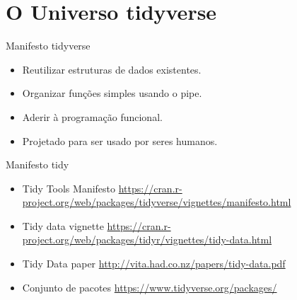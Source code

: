 \documentclass[
  9pt,
  ignorenonframetext,
]{beamer}
\begin{document}
\hypertarget{o-universo-tidyverse}{%
\section{O Universo tidyverse}\label{o-universo-tidyverse}}

\begin{frame}{Manifesto tidyverse}
\protect\hypertarget{manifesto-tidyverse}{}
\begin{itemize}
\item
  Reutilizar estruturas de dados existentes.
\item
  Organizar funções simples usando o pipe.
\item
  Aderir à programação funcional.
\item
  Projetado para ser usado por seres humanos.
\end{itemize}
\end{frame}

\begin{frame}{Manifesto tidy}
\protect\hypertarget{manifesto-tidy}{}
\begin{itemize}
\item
  Tidy Tools Manifesto
  \url{https://cran.r-project.org/web/packages/tidyverse/vignettes/manifesto.html}
\item
  Tidy data vignette
  \url{https://cran.r-project.org/web/packages/tidyr/vignettes/tidy-data.html}
\item
  Tidy Data paper \url{http://vita.had.co.nz/papers/tidy-data.pdf}
\item
  Conjunto de pacotes \url{https://www.tidyverse.org/packages/}
\end{itemize}
\end{frame}
\end{document}
